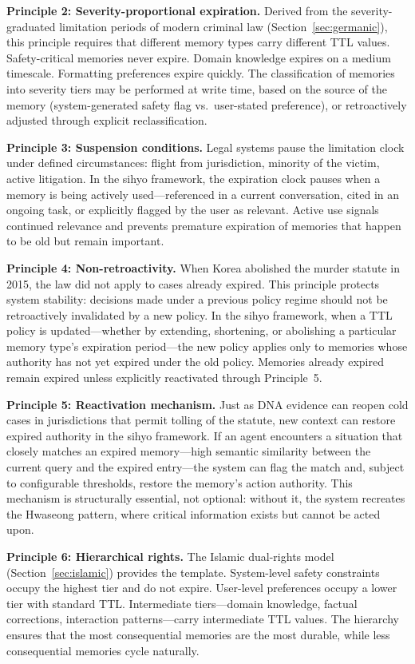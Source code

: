 \documentclass[12pt]{article}
\begin{document}
\textbf{Principle 2: Severity-proportional expiration.} Derived from the severity-graduated limitation periods of modern criminal law (Section~\ref{sec:germanic}), this principle requires that different memory types carry different TTL values. Safety-critical memories never expire. Domain knowledge expires on a medium timescale. Formatting preferences expire quickly. The classification of memories into severity tiers may be performed at write time, based on the source of the memory (system-generated safety flag vs.\ user-stated preference), or retroactively adjusted through explicit reclassification.

\textbf{Principle 3: Suspension conditions.} Legal systems pause the limitation clock under defined circumstances: flight from jurisdiction, minority of the victim, active litigation. In the sihyo framework, the expiration clock pauses when a memory is being actively used---referenced in a current conversation, cited in an ongoing task, or explicitly flagged by the user as relevant. Active use signals continued relevance and prevents premature expiration of memories that happen to be old but remain important.

\textbf{Principle 4: Non-retroactivity.} When Korea abolished the murder statute in 2015, the law did not apply to cases already expired. This principle protects system stability: decisions made under a previous policy regime should not be retroactively invalidated by a new policy. In the sihyo framework, when a TTL policy is updated---whether by extending, shortening, or abolishing a particular memory type's expiration period---the new policy applies only to memories whose authority has not yet expired under the old policy. Memories already expired remain expired unless explicitly reactivated through Principle~5.

\textbf{Principle 5: Reactivation mechanism.} Just as DNA evidence can reopen cold cases in jurisdictions that permit tolling of the statute, new context can restore expired authority in the sihyo framework. If an agent encounters a situation that closely matches an expired memory---high semantic similarity between the current query and the expired entry---the system can flag the match and, subject to configurable thresholds, restore the memory's action authority. This mechanism is structurally essential, not optional: without it, the system recreates the Hwaseong pattern, where critical information exists but cannot be acted upon.

\textbf{Principle 6: Hierarchical rights.} The Islamic dual-rights model (Section~\ref{sec:islamic}) provides the template. System-level safety constraints occupy the highest tier and do not expire. User-level preferences occupy a lower tier with standard TTL. Intermediate tiers---domain knowledge, factual corrections, interaction patterns---carry intermediate TTL values. The hierarchy ensures that the most consequential memories are the most durable, while less consequential memories cycle naturally.
\end{document}

